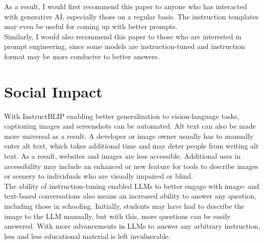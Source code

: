 \documentclass[12pt, letterpaper]{article}
\begin{document}
\begin{spacing}{1.10}
As a result, I would first recommend this paper to anyone who has interacted with generative AI, especially those on a regular basis. The instruction templates may even be useful for coming up with better prompts.\\

Similarly, I would also recommend this paper to those who are interested in prompt engineering, since some models are instruction-tuned and instruction format may be more conducive to better answers.

\section{Social Impact}
\label{sec:impact}
\leavevmode\par\noindent
With InstructBLIP enabling better generalization to vision-language tasks, captioning images and screenshots can be automated. Alt text can also be made more universal as a result. A developer or image owner usually has to manually enter alt text, which takes additional time and may deter people from writing alt text. As a result, websites and images are less accessible. Additional uses in accessibility may include an enhanced or new feature for tools to describe images or scenery to individuals who are visually impaired or blind.\\

The ability of instruction-tuning enabled LLMs to better engage with image- and text-based conversations also means an increased ability to answer any question, including those in schooling. Initially, students may have had to describe the image to the LLM manually, but with this, more questions can be easily answered. With more advancements in LLMs to answer any arbitrary instruction, less and less educational material is left invulnerable.


\end{spacing}
\end{document}
